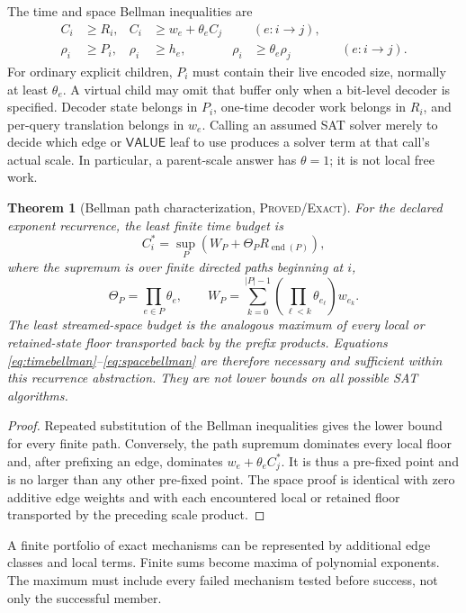 \documentclass[11pt]{article}
\newtheorem{theorem}{Theorem}[section]
\newcommand{\VALUE}{\mathsf{VALUE}}
\begin{document}
The time and space Bellman inequalities are
\begin{align}
 C_i&\ge R_i, & C_i&\ge w_e+\theta_eC_j
     &&(e:i\to j),\label{eq:timebellman}\\
 \rho_i&\ge P_i, & \rho_i&\ge h_e,&
 \rho_i&\ge\theta_e\rho_j
     &&(e:i\to j).\label{eq:spacebellman}
\end{align}
For ordinary explicit children, \(P_i\) must contain their live encoded size,
normally at least \(\theta_e\).  A virtual child may omit that buffer only
when a bit-level decoder is specified.  Decoder state belongs in \(P_i\),
one-time decoder work belongs in \(R_i\), and per-query translation belongs
in \(w_e\).  Calling an assumed SAT solver merely to decide which edge or
\(\VALUE\) leaf to use produces a solver term at that call's actual scale.
In particular, a parent-scale answer has \(\theta=1\); it is not local free
work.

\begin{theorem}[Bellman path characterization, \textsc{Proved/Exact}]
For the declared exponent recurrence, the least finite time budget is
\[
 C_i^*=\sup_P\left(W_P+\Theta_P R_{\operatorname{end}(P)}\right),
\]
where the supremum is over finite directed paths beginning at \(i\),
\[
 \Theta_P=\prod_{e\in P}\theta_e,
 \qquad
 W_P=\sum_{k=0}^{|P|-1}
       \left(\prod_{\ell<k}\theta_{e_\ell}\right)w_{e_k}.
\]
The least streamed-space budget is the analogous maximum of every local or
retained-state floor transported back by the prefix products.  Equations
\eqref{eq:timebellman}--\eqref{eq:spacebellman} are therefore necessary and
sufficient within this recurrence abstraction.  They are not lower bounds on
all possible SAT algorithms.
\end{theorem}

\begin{proof}
Repeated substitution of the Bellman inequalities gives the lower bound for
every finite path.  Conversely, the path supremum dominates every local floor
and, after prefixing an edge, dominates \(w_e+\theta_eC_j^*\).  It is thus a
pre-fixed point and is no larger than any other pre-fixed point.  The space
proof is identical with zero additive edge weights and with each encountered
local or retained floor transported by the preceding scale product.
\end{proof}

A finite portfolio of exact mechanisms can be represented by additional edge
classes and local terms.  Finite sums become maxima of polynomial exponents.
The maximum must include every failed mechanism tested before success, not
only the successful member.
\end{document}
